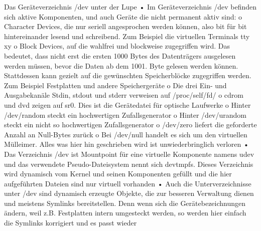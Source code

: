 Das Geräteverzeichnis /dev unter der Lupe
• Im Geräteverzeichnis /dev befinden sich aktive Komponenten, und auch Geräte die nicht
permanent aktiv sind:
o Character Devices, die nur seriell angesprochen werden können, also bit für bit
hintereinander lesend und schreibend.
Zum Beispiel die virtuellen Terminals tty xy
o Block Devices, auf die wahlfrei und blockweise zugegriffen wird. Das bedeutet, dass
nicht erst die ersten 1000 Bytes des Datenträgers ausgelesen werden müssen, bevor
die Daten ab dem 1001. Byte gelesen werden können. Stattdessen kann gezielt auf
die gewünschten Speicherblöcke zugegriffen werden.
Zum Beispiel Festplatten und andere Speichergeräte
o Die drei Ein- und Ausgabekanäle Stdin, stdout und stderr verweisen auf
/proc/self/fd/
o cdrom und dvd zeigen auf sr0. Dies ist die Gerätedatei für optische Laufwerke
o Hinter /dev/random steckt ein hochwertigen Zufallsgenerator
o Hinter /dev/urandom steckt ein nicht so hochwertigen Zufallsgenerator
o /dev/zero liefert die geforderte Anzahl an Null-Bytes zurück
o Bei /dev/null handelt es sich um den virtuellen Mülleimer. Alles was hier hin
geschrieben wird ist unwiederbringlich verloren
• Das Verzeichnis /dev ist Mountpoint für eine virtuelle Komponente namens udev und das
verwendete Pseudo-Dateisystem nennt sich devtmpfs. Dieses Verzeichnis wird dynamisch
vom Kernel und seinen Komponenten gefüllt und die hier aufgeführten Dateien sind nur
virtuell vorhanden
• Auch die Unterverzeichnisse unter /dev sind dynamisch erzeugte Objekte, die zur besseren
Verwaltung dienen und meistens Symlinks bereitstellen. Denn wenn sich die
Gerätebezeichnungen ändern, weil z.B. Festplatten intern umgesteckt werden, so werden
hier einfach die Symlinks korrigiert und es passt wieder 